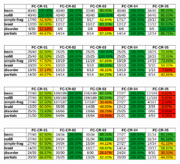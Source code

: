 \begin{figure}
    \centering

    \begin{subfigure}{\linewidth}
        \includegraphics[width=\linewidth]{fig/photorec_results_carve.pdf}
    \end{subfigure}
    \begin{subfigure}{\linewidth}
        \includegraphics[width=\linewidth]{fig/foremost_results_carve.pdf}
    \end{subfigure}
    \begin{subfigure}{\linewidth}
        \includegraphics[width=\linewidth]{fig/scalpel_results_carve.pdf}
    \end{subfigure}
    \begin{subfigure}{\linewidth}
        \includegraphics[width=\linewidth]{fig/axiom_results_carve.pdf}
    \end{subfigure}
        
    \caption{}
    \label{fig:results_carve}
\end{figure}

